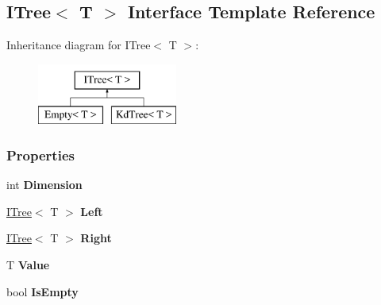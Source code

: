 \hypertarget{interfaceTree_1_1ITree}{}\subsection{I\+Tree$<$ T $>$ Interface Template Reference}
\label{interfaceTree_1_1ITree}
Inheritance diagram for I\+Tree$<$ T $>$\+:\begin{figure}[H]
\begin{center}
\leavevmode
\includegraphics[height=2.000000cm]{interfaceTree_1_1ITree}
\end{center}
\end{figure}
\subsubsection*{Properties}
\begin{DoxyCompactItemize}
\item 
\mbox{\label{interfaceTree_1_1ITree_a9fa96587382d530a02e7e15b047e82ee}} 
int {\bfseries Dimension}
\item 
\mbox{\label{interfaceTree_1_1ITree_ab08dc0c825bf3d24d4a6f9d238faaefb}} 
\hyperlink{interfaceTree_1_1ITree}{I\+Tree}$<$ T $>$ {\bfseries Left}
\item 
\mbox{\label{interfaceTree_1_1ITree_ad438dde947eb8d4fa0b73ebb3d7973e9}} 
\hyperlink{interfaceTree_1_1ITree}{I\+Tree}$<$ T $>$ {\bfseries Right}
\item 
\mbox{\label{interfaceTree_1_1ITree_adbfa996292c448f754363aa83d4be8e6}} 
T {\bfseries Value}
\item 
\mbox{\label{interfaceTree_1_1ITree_aaaa6c7dd3bd14dc2ce7f0780de528bb1}} 
bool {\bfseries Is\+Empty}
\end{DoxyCompactItemize}
